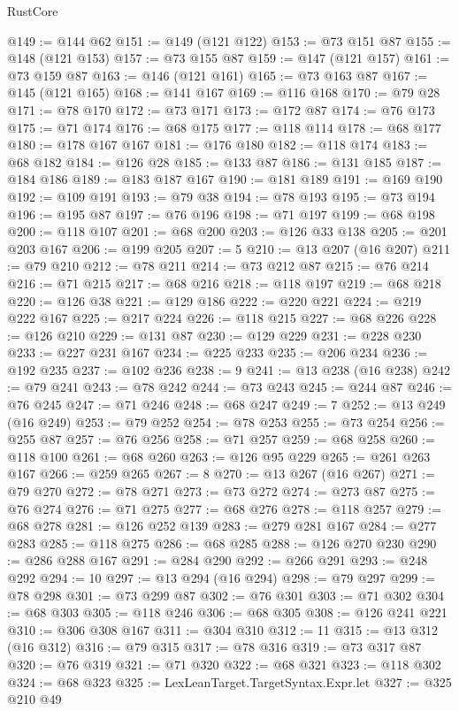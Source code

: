 \begin{lexlean}{RustCore}
\begin{coremodule}
@149 := @144 @62
@151 := @149 (@121 @122)
@153 := @73 @151 @87
@155 := @148 (@121 @153)
@157 := @73 @155 @87
@159 := @147 (@121 @157)
@161 := @73 @159 @87
@163 := @146 (@121 @161)
@165 := @73 @163 @87
@167 := @145 (@121 @165)
@168 := @141 @167
@169 := @116 @168
@170 := @79 @28
@171 := @78 @170
@172 := @73 @171
@173 := @172 @87
@174 := @76 @173
@175 := @71 @174
@176 := @68 @175
@177 := @118 @114
@178 := @68 @177
@180 := @178 @167 @167
@181 := @176 @180
@182 := @118 @174
@183 := @68 @182
@184 := @126 @28
@185 := @133 @87
@186 := @131 @185
@187 := @184 @186
@189 := @183 @187 @167
@190 := @181 @189
@191 := @169 @190
@192 := @109 @191
@193 := @79 @38
@194 := @78 @193
@195 := @73 @194
@196 := @195 @87
@197 := @76 @196
@198 := @71 @197
@199 := @68 @198
@200 := @118 @107
@201 := @68 @200
@203 := @126 @33 @138
@205 := @201 @203 @167
@206 := @199 @205
@207 := 5
@210 := @13 @207 (@16 @207)
@211 := @79 @210
@212 := @78 @211
@214 := @73 @212 @87
@215 := @76 @214
@216 := @71 @215
@217 := @68 @216
@218 := @118 @197
@219 := @68 @218
@220 := @126 @38
@221 := @129 @186
@222 := @220 @221
@224 := @219 @222 @167
@225 := @217 @224
@226 := @118 @215
@227 := @68 @226
@228 := @126 @210
@229 := @131 @87
@230 := @129 @229
@231 := @228 @230
@233 := @227 @231 @167
@234 := @225 @233
@235 := @206 @234
@236 := @192 @235
@237 := @102 @236
@238 := 9
@241 := @13 @238 (@16 @238)
@242 := @79 @241
@243 := @78 @242
@244 := @73 @243
@245 := @244 @87
@246 := @76 @245
@247 := @71 @246
@248 := @68 @247
@249 := 7
@252 := @13 @249 (@16 @249)
@253 := @79 @252
@254 := @78 @253
@255 := @73 @254
@256 := @255 @87
@257 := @76 @256
@258 := @71 @257
@259 := @68 @258
@260 := @118 @100
@261 := @68 @260
@263 := @126 @95 @229
@265 := @261 @263 @167
@266 := @259 @265
@267 := 8
@270 := @13 @267 (@16 @267)
@271 := @79 @270
@272 := @78 @271
@273 := @73 @272
@274 := @273 @87
@275 := @76 @274
@276 := @71 @275
@277 := @68 @276
@278 := @118 @257
@279 := @68 @278
@281 := @126 @252 @139
@283 := @279 @281 @167
@284 := @277 @283
@285 := @118 @275
@286 := @68 @285
@288 := @126 @270 @230
@290 := @286 @288 @167
@291 := @284 @290
@292 := @266 @291
@293 := @248 @292
@294 := 10
@297 := @13 @294 (@16 @294)
@298 := @79 @297
@299 := @78 @298
@301 := @73 @299 @87
@302 := @76 @301
@303 := @71 @302
@304 := @68 @303
@305 := @118 @246
@306 := @68 @305
@308 := @126 @241 @221
@310 := @306 @308 @167
@311 := @304 @310
@312 := 11
@315 := @13 @312 (@16 @312)
@316 := @79 @315
@317 := @78 @316
@319 := @73 @317 @87
@320 := @76 @319
@321 := @71 @320
@322 := @68 @321
@323 := @118 @302
@324 := @68 @323
@325 := LexLeanTarget.TargetSyntax.Expr.let
@327 := @325 @210 @49

\end{coremodule}
\end{lexlean}
